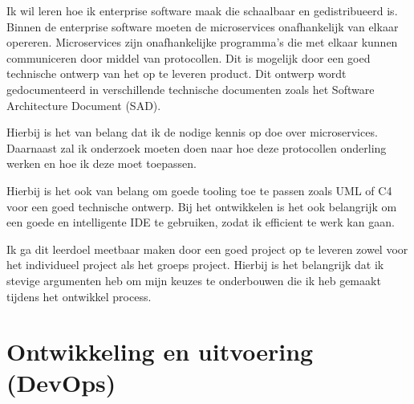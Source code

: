 Ik wil leren hoe ik enterprise software maak die schaalbaar en gedistribueerd is.
Binnen de enterprise software moeten de microservices onafhankelijk van elkaar opereren.
Microservices zijn onafhankelijke programma's die met elkaar kunnen communiceren door middel van protocollen.
Dit is mogelijk door een goed technische ontwerp van het op te leveren product.
Dit ontwerp wordt gedocumenteerd in verschillende technische documenten zoals het Software Architecture Document (SAD).

Hierbij is het van belang dat ik de nodige kennis op doe over microservices.
Daarnaast zal ik onderzoek moeten doen naar hoe deze protocollen onderling werken en hoe ik deze moet toepassen.

Hierbij is het ook van belang om goede tooling toe te passen zoals UML of C4 voor een goed technische ontwerp.
Bij het ontwikkelen is het ook belangrijk om een goede en intelligente IDE te gebruiken, zodat ik efficient te werk
kan gaan.

Ik ga dit leerdoel meetbaar maken door een goed project op te leveren zowel voor het individueel project als het
groeps project.
Hierbij is het belangrijk dat ik stevige argumenten heb om mijn keuzes te onderbouwen die ik heb gemaakt tijdens
het ontwikkel process.


\section{Ontwikkeling en uitvoering (DevOps)}\label{sec:ontwikkeling-en-uitvoering-(devops)}


